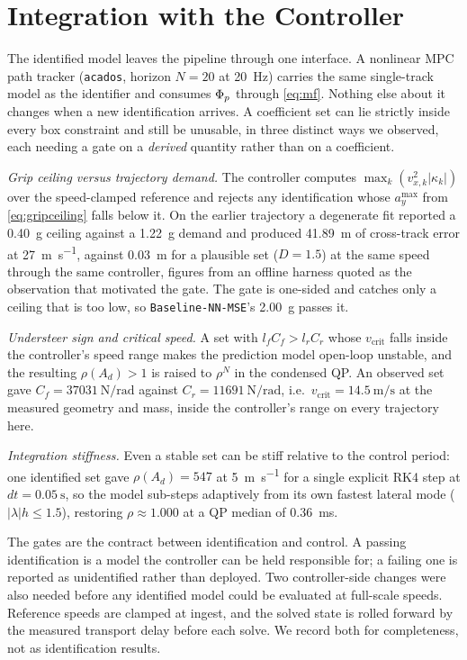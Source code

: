 \section{Integration with the Controller}
\label{sec:integration}

The identified model leaves the pipeline through one interface. A nonlinear MPC
path tracker (\texttt{acados}, horizon $N=20$ at \SI{20}{\hertz}) carries the
same single-track model as the identifier and consumes $\Phi_{p}$ through
\eqref{eq:mf}. Nothing else about it changes when a new identification arrives.
A coefficient set can lie strictly inside every box constraint and still be
unusable, in three distinct ways we observed, each needing a gate on a
\emph{derived} quantity rather than on a coefficient.

\emph{Grip ceiling versus trajectory demand.} The controller computes
$\max_{k}(v_{x,k}^{2}|\kappa_{k}|)$ over the speed-clamped reference and
rejects any identification whose $a_{y}^{\max}$ from \eqref{eq:gripceiling}
falls below it. On the earlier trajectory a degenerate fit reported a
\SI{0.40}{\g} ceiling against a \SI{1.22}{\g} demand and produced
\SI{41.89}{\meter} of cross-track error at \SI{27}{\meter\per\second}, against
\SI{0.03}{\meter} for a plausible set ($D=\num{1.5}$) at the same speed through
the same controller, figures from an offline harness quoted as the observation
that motivated the gate. The gate is one-sided and catches
only a ceiling that is too low, so \texttt{Baseline-NN-MSE}'s \SI{2.00}{\g}
passes it.

\emph{Understeer sign and critical speed.} A set with $l_{f}C_{f}>l_{r}C_{r}$
whose $v_{\mathrm{crit}}$ falls inside the controller's speed range makes the
prediction model open-loop unstable, and the resulting $\rho(A_{d})>1$ is
raised to $\rho^{N}$ in the condensed QP. An observed set gave
$C_{f}=\SI{37031}{\newton\per\radian}$ against
$C_{r}=\SI{11691}{\newton\per\radian}$, i.e.\
$v_{\mathrm{crit}}=\SI{14.5}{\meter\per\second}$ at the measured geometry and
mass, inside the controller's range on every trajectory here.

\emph{Integration stiffness.} Even a stable set can be stiff relative to the
control period: one identified set gave $\rho(A_{d})=547$ at
\SI{5}{\meter\per\second} for a single explicit RK4 step at
$dt=\SI{0.05}{\second}$, so the model sub-steps adaptively from its own
fastest lateral mode ($|\lambda|h\le1.5$), restoring $\rho\approx1.000$ at a
QP median of \SI{0.36}{\milli\second}.

The gates are the contract between identification and control. A passing
identification is a model the controller can be held responsible for; a failing
one is reported as unidentified rather than deployed. Two controller-side
changes were also needed before any identified model could be evaluated at
full-scale speeds. Reference speeds are clamped at ingest, and the solved state
is rolled forward by the measured transport delay before each solve. We record
both for completeness, not as identification results.
